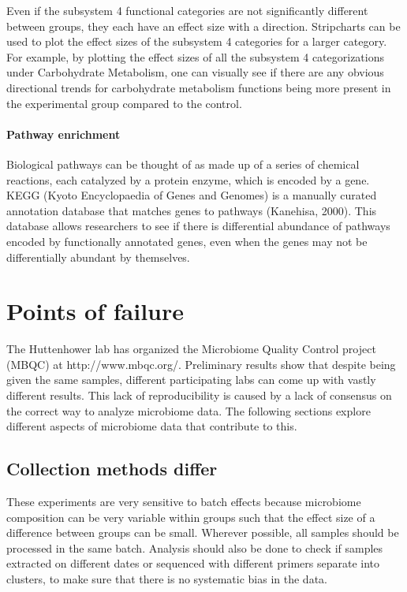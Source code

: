 Even if the subsystem 4 functional categories are not significantly different between groups, they each have an effect size with a direction. Stripcharts can be used to plot the effect sizes of the subsystem 4 categories for a larger category. For example, by plotting the effect sizes of all the subsystem 4 categorizations under Carbohydrate Metabolism, one can visually see if there are any obvious directional trends for carbohydrate metabolism functions being more present in the experimental group compared to the control.

\paragraph{Pathway enrichment}
Biological pathways can be thought of as made up of a series of chemical reactions, each catalyzed by a protein enzyme, which is encoded by a gene. KEGG (Kyoto Encyclopaedia of Genes and Genomes) is a manually curated annotation database that matches genes to pathways (Kanehisa, 2000). This database allows researchers to see if there is differential abundance of pathways encoded by functionally annotated genes, even when the genes may not be differentially abundant by themselves.

\section{Points of failure}
The Huttenhower lab has organized the Microbiome Quality Control project (MBQC) at http://www.mbqc.org/. Preliminary results show that despite being given the same samples, different participating labs can come up with vastly different results. This lack of reproducibility is caused by a lack of consensus on the correct way to analyze microbiome data. The following sections explore different aspects of microbiome data that contribute to this.

\subsection{Collection methods differ}
These experiments are very sensitive to batch effects because microbiome composition can be very variable within groups such that the effect size of a difference between groups can be small. Wherever possible, all samples should be processed in the same batch. Analysis should also be done to check if samples extracted on different dates or sequenced with different primers separate into clusters, to make sure that there is no systematic bias in the data.


